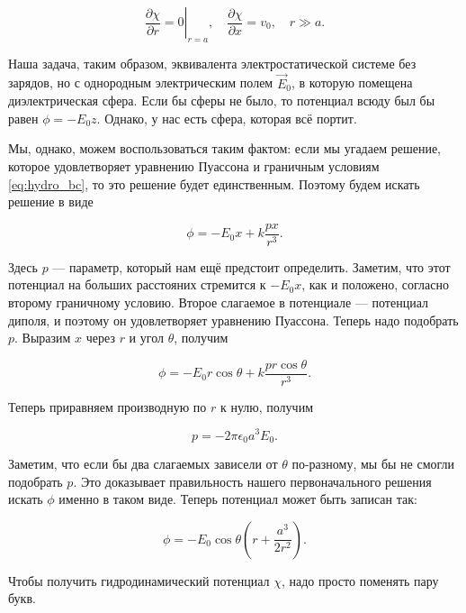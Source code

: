 \documentclass[11pt,a4paper]{article}
\numberwithin{equation}{section}
\newcommand{\pt}{\partial}
\newcommand{\eps}{\epsilon}
\begin{document}
\begin{equation}
  \label{eq:hydro_bc}
  \left.\frac{\pt \chi}{\pt r} = 0\right|_{r=a}, \quad \frac{\pt
    \chi}{\pt x} = v_0, \quad r \gg a.
\end{equation}

Наша задача, таким образом, эквивалента электростатической системе без
зарядов, но с однородным электрическим полем $\vec{E}_0$, в которую
помещена диэлектрическая сфера. Если бы сферы не было, то потенциал
всюду был бы равен $\phi = - E_0 z$. Однако, у нас есть сфера, которая
всё портит. 

Мы, однако, можем воспользоваться таким фактом: если мы угадаем
решение, которое удовлетворяет уравнению Пуассона и граничным
условиям \eqref{eq:hydro_bc}, то это решение будет
единственным. Поэтому будем искать решение в виде 

\begin{equation}
  \label{eq:hydro_4}
  \phi = -E_0 x + k\frac{px}{r^3}.
\end{equation}

Здесь $p$ --- параметр, который нам ещё предстоит определить. Заметим,
что этот потенциал на больших расстояних стремится к $-E_0 x$, как и
положено, согласно второму граничному условию. Второе слагаемое в
потенциале --- потенциал диполя, и поэтому он удовлетворяет уравнению
Пуассона. Теперь надо подобрать $p$. Выразим $x$ через $r$ и угол
$\theta$, получим

\begin{equation}
  \label{eq:hydro_5}
  \phi = - E_0 r \cos \theta + k \frac{p r \cos \theta}{r^3}.
\end{equation}

Теперь приравняем производную по $r$ к нулю, получим

\begin{equation}
  \label{eq:hydro_6}
  p = -2\pi \eps_0 a^3 E_0.
\end{equation}

Заметим, что если бы два слагаемых зависели от $\theta$ по-разному, мы
бы не смогли подобрать $p$. Это доказывает правильность нашего
первоначального решения искать $\phi$ именно в таком виде. Теперь
потенциал может быть записан так: 

\begin{equation}
  \label{eq:hydro_7}
  \phi = -E_0 \cos \theta \left(r + \frac{a^3}{2r^2} \right).
\end{equation}

Чтобы получить гидродинамический потенциал $\chi$, надо просто
поменять пару букв. 
\end{document}
